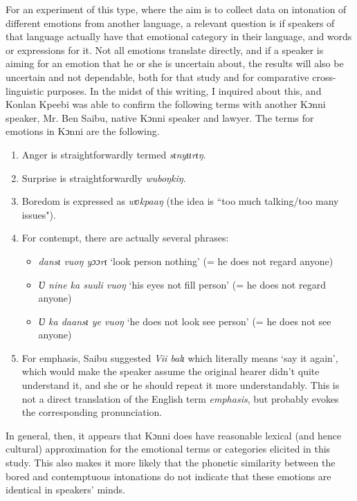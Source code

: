 \documentclass[output=paper]{langsci/langscibook}
\begin{document}
For an experiment of this type, where the aim is to collect data on intonation of different emotions from another language, a relevant question is if speakers of that language actually have that emotional category in their language, and words or expressions for it. Not all emotions translate directly, and if a speaker is aiming for an emotion that he or she is uncertain about, the results will also be uncertain and not dependable, both for that study and for comparative cross-linguistic purposes. In the midst of this writing, I inquired about this, and Konlan Kpeebi was able to confirm the following terms with another Kɔnni speaker, Mr. Ben Saibu, native Kɔnni speaker and lawyer. The terms for emotions in Kɔnni are the following.


\begin{enumerate}
\item Anger is straightforwardly termed \emph{sɩnyɩɩrɩŋ}.
\item Surprise is straightforwardly \emph{wuboŋkiŋ}. 
\item Boredom is expressed as \emph{wʋkpaaŋ} (the idea is ``too much talking/too many issues").
\item For contempt, there are actually several phrases: 

\begin{itemize}
\item \emph{dansɩ vuoŋ yɔɔrɩ} `look person nothing' (= he does not regard anyone) 
\item \emph{Ʋ nine ka suuli vuoŋ} `his eyes not fill person' (= he does not regard anyone) 
\item \emph{Ʋ ka daansɩ ye vuoŋ} `he does not look see person' (= he does not see anyone)
\end{itemize}
\item For emphasis, Saibu suggested \textit{Vii balɩ} which literally means `say it again', which would make the speaker assume the original hearer didn't quite understand it, and she or he should repeat it more understandably. This is not a direct translation of the English term \emph{emphasis}, but probably evokes the corresponding pronunciation.
\end{enumerate}

In general, then, it appears that Kɔnni does have reasonable lexical (and hence cultural) approximation for the emotional terms or categories elicited in this study. This also makes it more likely that the phonetic similarity between the bored and contemptuous intonations do not indicate that these emotions are identical in speakers' minds. 
\end{document}
